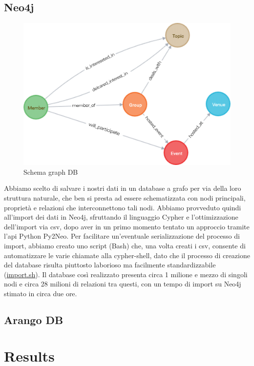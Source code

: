 \documentclass[fleqn,10pt]{SelfArx} %
\begin{document}
{\subsection{Neo4j}%
\begin{figure}
\centering
\includegraphics[scale=0.57]{graph.png}
\caption{\label{graph_neo4j} Schema graph DB}
\end{figure}
Abbiamo scelto di salvare i nostri dati in un database a grafo per via della loro struttura naturale, che ben si presta ad essere schematizzata con nodi principali, proprietà e relazioni che interconnettono tali nodi. Abbiamo provveduto quindi all'import dei dati in Neo4j, sfruttando il linguaggio Cypher e l'ottimizzazione dell'import via csv, dopo aver in un primo momento tentato un approccio tramite l'api Python Py2Neo. Per facilitare un'eventuale serializzazione del processo di import, abbiamo creato uno script (Bash) che, una volta creati i csv, consente di automatizzare le varie chiamate alla cypher-shell, dato che il processo di creazione del database risulta piuttosto laborioso ma facilmente standardizzabile (\href{https://github.com/DBertazioli/NeoMeetup/blob/master/Scripts/import_cypher.sh}{import.sh}). Il database così realizzato presenta circa 1 milione e mezzo di singoli nodi e circa 28 milioni di relazioni tra questi, con un tempo di import su Neo4j stimato in circa due ore.
\subsection{Arango DB}
}
\section{Results}
\end{document}

